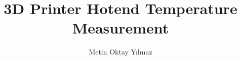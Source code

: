\documentclass[12pt,a4paper]{article}
\title{3D Printer Hotend Temperature Measurement}
\author{Metin Oktay Yılmaz}
\begin{document}
    

    \tableofcontents
    \singlespacing
    \listoffigures
    \singlespacing
    \listoftables
    \singlespacing

    
    
    
    
    
    
    
    
\end{document}
